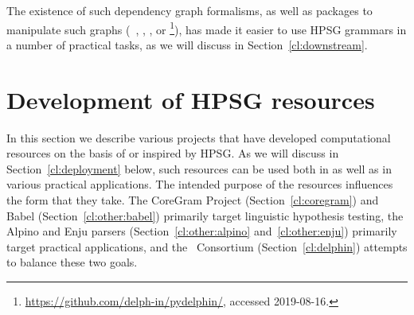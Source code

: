 \documentclass[output=paper
 	        ,biblatex
                ,babelshorthands
                ,newtxmath
                ,draftmode
                ,colorlinks, citecolor=brown
]{langscibook}
\begin{document}
The existence of such dependency graph formalisms,
as well as  packages to manipulate such graphs (\eg\ \citealt{ivanova2012dm}, \citealt{copestake2016pydmrs}, \citealt{Her:Kuh:Oep:19}, or \footnote{\url{https://github.com/delph-in/pydelphin/}, accessed 2019-08-16.}),
has made it easier to use HPSG grammars in a number of practical tasks,
as we will discuss in Section~\ref{cl:downstream}.








\section{Development of HPSG resources}
\label{cl:resources}


In this section we describe various projects that have developed computational
resources on the basis of or inspired by HPSG.  As we will discuss in Section~\ref{cl:deployment}
below, such resources can be used both in  as well as in various
practical applications.  The intended purpose of the resources influences the form that they
take.  The CoreGram Project (Section~\ref{cl:coregram}) and Babel (Section~\ref{cl:other:babel})
primarily target linguistic hypothesis testing, the Alpino and Enju parsers
(Section~\ref{cl:other:alpino} and~\ref{cl:other:enju}) primarily target practical applications, and
the \delphin\ Consortium (Section~\ref{cl:delphin}) attempts to balance these two goals.
\end{document}
